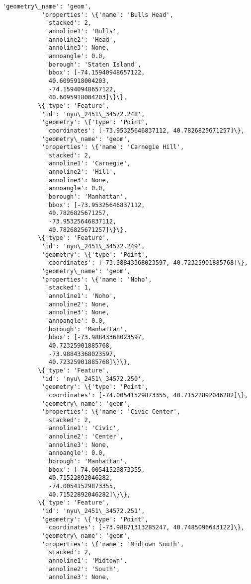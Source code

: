 \documentclass[11pt]{article}
\begin{document}
\begin{Verbatim}[commandchars=\\\{\}]
           'geometry\_name': 'geom',
           'properties': \{'name': 'Bulls Head',
            'stacked': 2,
            'annoline1': 'Bulls',
            'annoline2': 'Head',
            'annoline3': None,
            'annoangle': 0.0,
            'borough': 'Staten Island',
            'bbox': [-74.15940948657122,
             40.6095918004203,
             -74.15940948657122,
             40.6095918004203]\}\},
          \{'type': 'Feature',
           'id': 'nyu\_2451\_34572.248',
           'geometry': \{'type': 'Point',
            'coordinates': [-73.95325646837112, 40.7826825671257]\},
           'geometry\_name': 'geom',
           'properties': \{'name': 'Carnegie Hill',
            'stacked': 2,
            'annoline1': 'Carnegie',
            'annoline2': 'Hill',
            'annoline3': None,
            'annoangle': 0.0,
            'borough': 'Manhattan',
            'bbox': [-73.95325646837112,
             40.7826825671257,
             -73.95325646837112,
             40.7826825671257]\}\},
          \{'type': 'Feature',
           'id': 'nyu\_2451\_34572.249',
           'geometry': \{'type': 'Point',
            'coordinates': [-73.98843368023597, 40.72325901885768]\},
           'geometry\_name': 'geom',
           'properties': \{'name': 'Noho',
            'stacked': 1,
            'annoline1': 'Noho',
            'annoline2': None,
            'annoline3': None,
            'annoangle': 0.0,
            'borough': 'Manhattan',
            'bbox': [-73.98843368023597,
             40.72325901885768,
             -73.98843368023597,
             40.72325901885768]\}\},
          \{'type': 'Feature',
           'id': 'nyu\_2451\_34572.250',
           'geometry': \{'type': 'Point',
            'coordinates': [-74.00541529873355, 40.71522892046282]\},
           'geometry\_name': 'geom',
           'properties': \{'name': 'Civic Center',
            'stacked': 2,
            'annoline1': 'Civic',
            'annoline2': 'Center',
            'annoline3': None,
            'annoangle': 0.0,
            'borough': 'Manhattan',
            'bbox': [-74.00541529873355,
             40.71522892046282,
             -74.00541529873355,
             40.71522892046282]\}\},
          \{'type': 'Feature',
           'id': 'nyu\_2451\_34572.251',
           'geometry': \{'type': 'Point',
            'coordinates': [-73.98871313285247, 40.7485096643122]\},
           'geometry\_name': 'geom',
           'properties': \{'name': 'Midtown South',
            'stacked': 2,
            'annoline1': 'Midtown',
            'annoline2': 'South',
            'annoline3': None,

\end{Verbatim}
\end{document}
